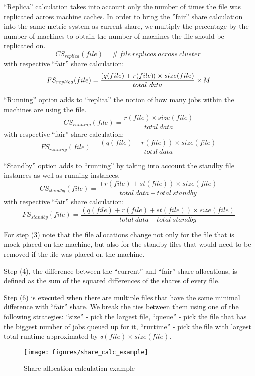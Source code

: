 ``Replica'' calculation takes into account only the number of times the file was replicated across machine caches. In order to bring the ''fair'' share calculation into the same metric system as current share, we multiply the percentage by the number of machines to obtain the number of machines the file should be replicated on.
$$CS_{replica} (file) = \#\ file\ replicas\ across\ cluster\ $$
with respective ``fair'' share calculation:
$$FS_{replica} (file) \\= \frac{(q(file) + r(file)) \times size(file)}{total\ data} \times M$$

``Running'' option adds to ``replica'' the notion of how many jobs within the machines are using the file. 
$$CS_{running} (file) =  \frac{r(file) \times size(file)}{total\ data}$$
with respective ``fair'' share calculation:
$$FS_{running} (file) = \frac{(q(file) + r(file)) \times size(file)}{total\ data}$$

``Standby'' option adds to ``running'' by taking into account the standby file instances as well as running instances.
$$CS_{standby} (file) = \frac{(r(file) + st(file)) \times size(file)}{total\ data + total\ standby}$$
with respective ``fair'' share calculation:
$$FS_{standby} (file) = \frac{(q(file) + r(file) + st(file)) \times size(file)}{total\ data + total\ standby}$$

For step (3) note that the file allocations change not only for the file that is mock-placed on the machine, but also for the standby files that would need to be removed if the file was placed on the machine.

Step (4), the difference between the ``current'' and ``fair'' share allocations, is defined as the sum of the squared differences of the shares of every file.

Step (6) is executed when there are multiple files that have the same minimal difference with ``fair'' share. We break the ties between them using one of the following strategies: ``size'' - pick the largest file, ``queue'' - pick the file that has the biggest number of jobs queued up for it, ``runtime'' - pick the file with largest total runtime approximated by $q(file) \times size(file)$.

\begin{figure}
\begin{centering}
\texttt{[image: figures/share\_calc\_example]}\caption{\label{fig:share_calc_example}Share allocation calculation example}
\par\end{centering}
\end{figure}

